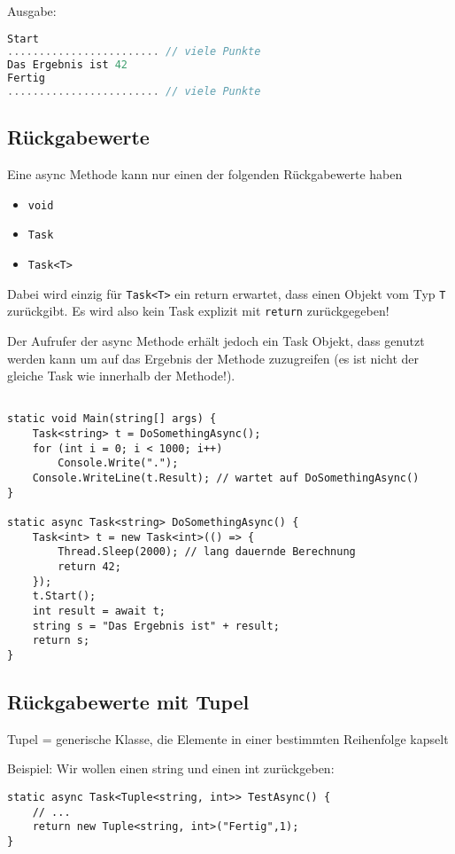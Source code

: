 Ausgabe:
\begin{lstlisting}[language=C]
Start
........................ // viele Punkte
Das Ergebnis ist 42
Fertig
........................ // viele Punkte
\end{lstlisting}

\subsection{Rückgabewerte}

Eine async Methode kann nur einen der folgenden Rückgabewerte haben

\begin{itemize}
\item \lstinline`void`
\item \lstinline`Task`
\item \lstinline`Task<T>`
\end{itemize}
Dabei wird einzig für \lstinline`Task<T>` ein return erwartet, dass einen Objekt vom Typ \lstinline`T` zurückgibt. Es wird also kein Task explizit mit \lstinline$return$ zurückgegeben!

Der Aufrufer der async Methode erhält jedoch ein Task Objekt, dass genutzt werden kann um auf das Ergebnis der Methode zuzugreifen (es ist nicht der gleiche Task wie innerhalb der Methode!).

\begin{lstlisting}[language={[Sharp]C}]

static void Main(string[] args) { 
	Task<string> t = DoSomethingAsync(); 
	for (int i = 0; i < 1000; i++) 
		Console.Write("."); 
	Console.WriteLine(t.Result); // wartet auf DoSomethingAsync()
} 

static async Task<string> DoSomethingAsync() { 
	Task<int> t = new Task<int>(() => { 
		Thread.Sleep(2000); // lang dauernde Berechnung 
		return 42; 
	}); 
	t.Start(); 
	int result = await t; 
	string s = "Das Ergebnis ist" + result; 
	return s; 
} 
\end{lstlisting}

\subsection{Rückgabewerte mit Tupel}

Tupel = generische Klasse, die Elemente in einer bestimmten Reihenfolge kapselt

Beispiel: Wir wollen einen string und einen int zurückgeben:
\begin{lstlisting}[language={[Sharp]C}]
static async Task<Tuple<string, int>> TestAsync() {
	// ...
	return new Tuple<string, int>("Fertig",1);
}
\end{lstlisting}

